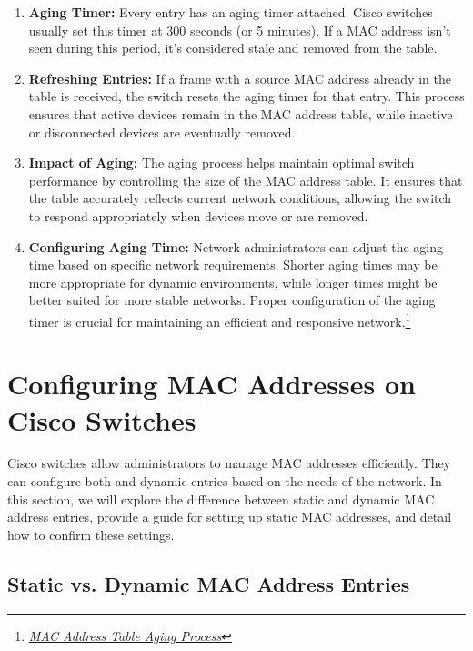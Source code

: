 \documentclass[11pt,a4paper]{article}
\begin{document}
\begin{enumerate}

    \item \textbf{Aging Timer:} Every entry has an aging timer attached. Cisco switches usually set this timer at 300 seconds (or 5 minutes). If a MAC address isn’t seen during this period, it's considered stale and removed from the table.

\item \textbf{Refreshing Entries:} If a frame with a source MAC address already in the table is received, the switch resets the aging timer for that entry. This process ensures that active devices remain in the MAC address table, while inactive or disconnected devices are eventually removed.

\item \textbf{Impact of Aging:} The aging process helps maintain optimal switch performance by controlling the size of the MAC address table. It ensures that the table accurately reflects current network conditions, allowing the switch to respond appropriately when devices move or are removed.

\item \textbf{Configuring Aging Time:} Network administrators can adjust the aging time based on specific network requirements. Shorter aging times may be more appropriate for dynamic environments, while longer times might be better suited for more stable networks. Proper configuration of the aging timer is crucial for maintaining an efficient and responsive network.\footnote{\href{https://community.cisco.com/t5/networking-knowledge-base/network-switching-operation/ta-p/4193160}{\textit{MAC Address Table Aging Process}}}
\end{enumerate}

\section*{Configuring MAC Addresses on Cisco Switches}

Cisco switches allow administrators to manage MAC addresses efficiently. They can configure both and dynamic entries based on the needs of the network. In this section, we will explore the difference between static and dynamic MAC address entries, provide a guide for setting up static MAC addresses, and detail how to confirm these settings.


\subsection*{Static vs. Dynamic MAC Address Entries}
\end{document}
